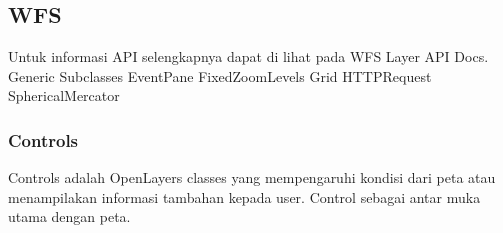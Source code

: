 \documentclass{article}
\begin{document}
\subsection {WFS}
Untuk informasi API selengkapnya dapat di lihat pada WFS Layer API Docs.
Generic Subclasses
EventPane
FixedZoomLevels
Grid
HTTPRequest
SphericalMercator

\subsubsection {Controls}
Controls adalah OpenLayers classes yang mempengaruhi kondisi dari peta atau menampilakan informasi tambahan kepada user. Control sebagai antar muka utama dengan peta.
\end{document}
